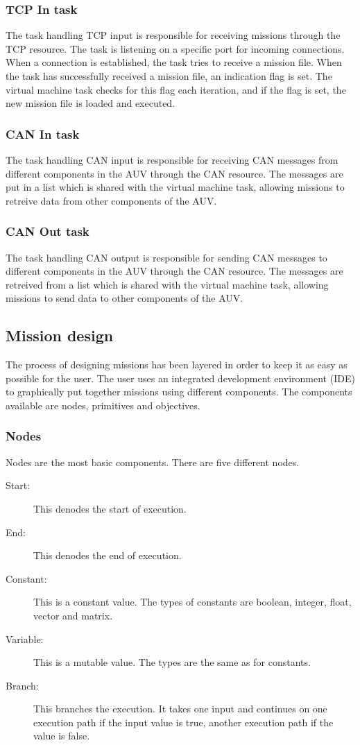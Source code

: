 \subsubsection{TCP In task}
The task handling TCP input is responsible for receiving missions through the TCP resource. The task is listening on a specific port for incoming connections. When a connection is established, the task tries to receive a mission file. When the task has successfully received a mission file, an indication flag is set. The virtual machine task checks for this flag each iteration, and if the flag is set, the new mission file is loaded and executed.

\subsubsection{CAN In task}
The task handling CAN input is responsible for receiving CAN messages from different components in the AUV through the CAN resource. The messages are put in a list which is shared with the virtual machine task, allowing missions to retreive data from other components of the AUV.

\subsubsection{CAN Out task}
The task handling CAN output is responsible for sending CAN messages to different components in the AUV through the CAN resource. The messages are retreived from a list which is shared with the virtual machine task, allowing missions to send data to other components of the AUV.

\subsection{Mission design}
The process of designing missions has been layered in order to keep it as easy as possible for the user. The user uses an integrated development environment (IDE) to graphically put together missions using different components. The components available are nodes, primitives and objectives.

\subsubsection{Nodes}
Nodes are the most basic components. There are five different nodes.
\begin{description}
\item[Start:] This denodes the start of execution.
\item[End:] This denodes the end of execution.
\item[Constant:] This is a constant value. The types of constants are boolean, integer, float, vector and matrix.
\item[Variable:] This is a mutable value. The types are the same as for constants.
\item[Branch:] This branches the execution. It takes one input and continues on one execution path if the input value is true, another execution path if the value is false.
\end{description}

